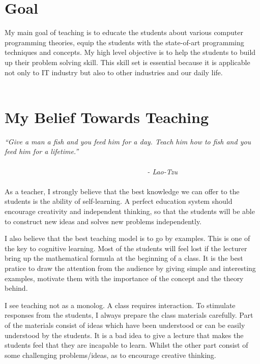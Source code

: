 \documentclass[12pt]{article}
\theoremstyle{plain} \numberwithin{equation}{section}
\theoremstyle{definition}
\begin{document}
\raisebox{1cm}

\section{ Goal}
My main goal of teaching is to educate the students about
various computer programming theories, equip the students with 
the state-of-art programming techniques and concepts.
My high level objective is to help the students to build up
their problem solving skill. 
This skill set is essential because it is applicable not only to 
IT industry but also to other industries and our daily life. 
\\ \\

\section{My Belief Towards Teaching}
{\em  
``Give a man a fish and you feed him for a day. Teach him how to 
fish and you feed him for a lifetime.''
} \\ \\
{\em
$~~~~~~~~~~~~~~~~~~~~~~~~~~~~~~~~~~~~~~~~~~~~~~~~~~~~~~~~~~~~~~~~~
~~~~~~~~~~~~~~~~~~~~~~~~$ - Lao-Tzu
}
\\ \\
As a teacher, I strongly believe that the best knowledge we can offer
to the students is the ability of self-learning. 
A perfect education system should encourage creativity and independent 
thinking, so that the students will be able to construct 
new ideas and solves new problems independently.


I also believe that the best teaching model is to go by examples.
This is one of the key to cognitive learning. Most of the students will
feel lost if the lecturer bring up the mathematical formula
at the beginning of a class. It is the best pratice to draw the attention
from the audience by giving simple and interesting examples, motivate them with 
the importance of the concept and the theory behind.

I see teaching not as a monolog. A class requires interaction. To stimulate 
responses from the students, I always prepare the class materials 
carefully. Part of the materials consist of ideas which have been
understood or can be easily understood by the students. 
It is a bad idea to give a lecture that makes the students feel that
they are incapable to learn.
Whilst the other part consist of some challenging problems/ideas,
as to encourage creative thinking.
\end{document}
